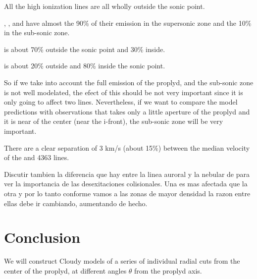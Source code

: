 \documentclass[aaspp]{article}
\begin{document}
All the high ionization lines are all wholly outside the sonic point.

\neii, \ha, \nii and \oii have almost the 90\% of their emission
in the supersonic zone and the 10\% in the sub-sonic zone.

\sii is about 70\% outside the sonic point and 30\% inside.

\oi is about 20\% outside and 80\% inside the sonic point.

So if we take into account the full emission of the proplyd, and the
sub-sonic zone is not well modelated, the efect of this should be not
very important since it is only going to affect two
lines. Nevertheless, if we want to compare the model predictions with
observations that takes only a little aperture of the proplyd and it
is near of the center (near the i-front), the sub-sonic zone will be
very important.

There are a clear separation of 3 km/s (about 15\%) between the median
velocity of the  and 4363 lines.

Discutir tambien la diferencia que hay entre la linea auroral y la
nebular de \nii para ver la importancia de las desexitaciones
colisionales. Una es mas afectada que la otra y por lo tanto conforme
vamos a las zonas de mayor densidad la razon entre ellas debe ir
cambiando, aumentando de hecho.

\section{Conclusion}
\label{sec:conclusions}

We will construct Cloudy models of a series of individual radial cuts from the center of the proplyd, at different angles $\theta$ from the proplyd axis.




\end{document}
